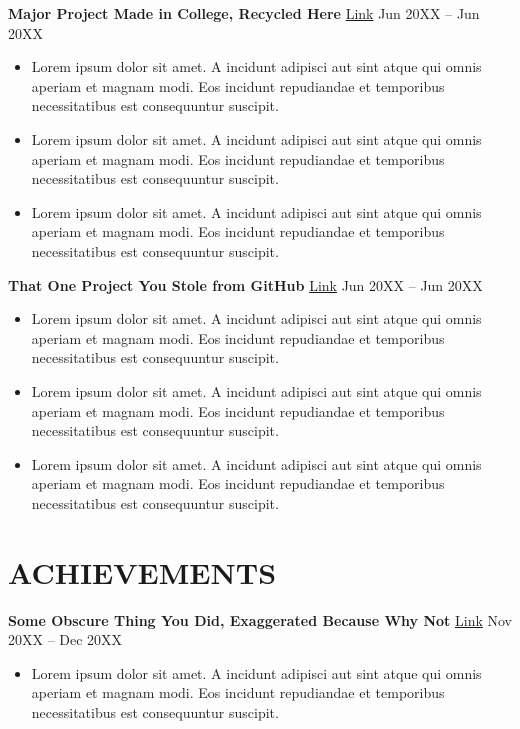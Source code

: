 \documentclass[10pt,letterpaper]{extarticle}
\begin{document}
\textbf{Major Project Made in College, Recycled Here} \href{https://github.com/}{Link} \hfill Jun 20XX -- Jun 20XX %
\begin{itemize}[leftmargin=*, nosep]
    \item Lorem ipsum dolor sit amet. A incidunt adipisci aut sint atque qui omnis aperiam et magnam modi. Eos incidunt repudiandae et temporibus necessitatibus est consequuntur suscipit. %
    \item Lorem ipsum dolor sit amet. A incidunt adipisci aut sint atque qui omnis aperiam et magnam modi. Eos incidunt repudiandae et temporibus necessitatibus est consequuntur suscipit. %
    \item Lorem ipsum dolor sit amet. A incidunt adipisci aut sint atque qui omnis aperiam et magnam modi. Eos incidunt repudiandae et temporibus necessitatibus est consequuntur suscipit. %
\end{itemize}
\vspace{2pt}

\textbf{That One Project You Stole from GitHub} \href{https://github.com/}{Link} \hfill Jun 20XX -- Jun 20XX %
\begin{itemize}[leftmargin=*, nosep]
    \item Lorem ipsum dolor sit amet. A incidunt adipisci aut sint atque qui omnis aperiam et magnam modi. Eos incidunt repudiandae et temporibus necessitatibus est consequuntur suscipit. %
    \item Lorem ipsum dolor sit amet. A incidunt adipisci aut sint atque qui omnis aperiam et magnam modi. Eos incidunt repudiandae et temporibus necessitatibus est consequuntur suscipit. %
    \item Lorem ipsum dolor sit amet. A incidunt adipisci aut sint atque qui omnis aperiam et magnam modi. Eos incidunt repudiandae et temporibus necessitatibus est consequuntur suscipit. %
\end{itemize}

\section*{ACHIEVEMENTS}
\textbf{Some Obscure Thing You Did, Exaggerated Because Why Not} \href{}{Link} \hfill Nov 20XX -- Dec 20XX %
\begin{itemize}[leftmargin=*, nosep]
\item Lorem ipsum dolor sit amet. A incidunt adipisci aut sint atque qui omnis aperiam et magnam modi. Eos incidunt repudiandae et temporibus necessitatibus est consequuntur suscipit. %
\end{itemize}
\end{document}
